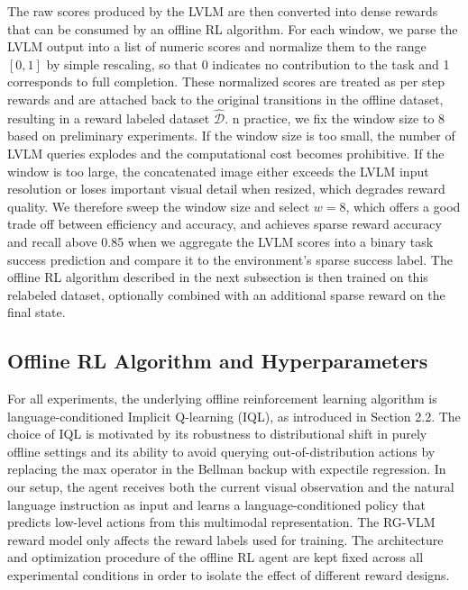 \documentclass[master,english,final]{kaist-ucs}
\begin{document}
The raw scores produced by the LVLM are then converted into dense rewards that can be consumed by an offline RL algorithm. For each window, we parse the LVLM output into a list of numeric scores and normalize them to the range $[0,1]$ by simple rescaling, so that 0 indicates no contribution to the task and 1 corresponds to full completion. These normalized scores are treated as per step rewards and are attached back to the original transitions in the offline dataset, resulting in a reward labeled dataset $\hat{\mathcal{D}}$. n practice, we fix the window size to 8 based on preliminary experiments. If the window size is too small, the number of LVLM queries explodes and the computational cost becomes prohibitive. If the window is too large, the concatenated image either exceeds the LVLM input resolution or loses important visual detail when resized, which degrades reward quality. We therefore sweep the window size and select $w=8$, which offers a good trade off between efficiency and accuracy, and achieves sparse reward accuracy and recall above 0.85 when we aggregate the LVLM scores into a binary task success prediction and compare it to the environment’s sparse success label. The offline RL algorithm described in the next subsection is then trained on this relabeled dataset, optionally combined with an additional sparse reward on the final state.

\subsection{Offline RL Algorithm and Hyperparameters}
For all experiments, the underlying offline reinforcement learning algorithm is language-conditioned Implicit Q-learning (IQL), as introduced in Section 2.2. The choice of IQL is motivated by its robustness to distributional shift in purely offline settings and its ability to avoid querying out-of-distribution actions by replacing the max operator in the Bellman backup with expectile regression. In our setup, the agent receives both the current visual observation and the natural language instruction as input and learns a language-conditioned policy that predicts low-level actions from this multimodal representation. The RG-VLM reward model only affects the reward labels used for training. The architecture and optimization procedure of the offline RL agent are kept fixed across all experimental conditions in order to isolate the effect of different reward designs.
\end{document}
